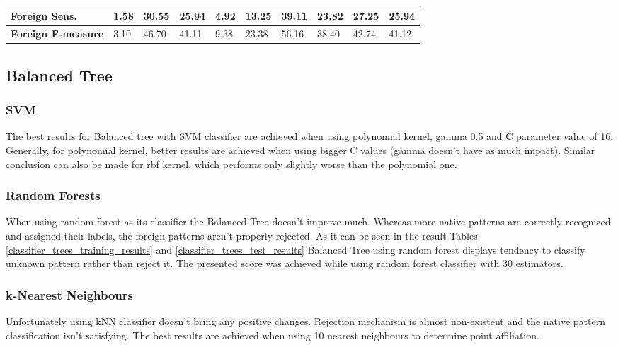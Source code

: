 \begin{table}[htp]
{\begin{tabular}{l|l|l|l|l|l|l|l|l|l|}
			\multicolumn{1}{|l|}{\textbf{Foreign Sens.}}       & 1.58          & 30.55         & 25.94       & 4.92          & 13.25         & 39.11       & 23.82          & 27.25         & 25.94        \\ \hline
			\multicolumn{1}{|l|}{\textbf{Foreign F-measure}}         & 3.10          & 46.70         & 41.11       & 9.38          & 23.38         & 56.16       & 38.40          & 42.74         & 41.12        \\ \hline
		\end{tabular}
	}
\end{table}

\subsection{Balanced Tree}

\subsubsection{SVM}

The best results for Balanced tree with SVM classifier are achieved when using polynomial kernel, gamma 0.5 and C parameter value of 16. Generally, for polynomial kernel, better results are achieved when using bigger C values (gamma doesn't have as much impact). Similar conclusion can also be made for rbf kernel, which performs only slightly worse than the polynomial one.

\subsubsection{Random Forests}

When using random forest as its classifier the Balanced Tree doesn't improve much. Whereas more native patterns are correctly recognized and assigned their labels, the foreign patterns aren't properly rejected. As it can be seen in the result Tables \ref{classifier_trees_training_results} and \ref{classifier_trees_test_results} Balanced Tree using random forest displays tendency to classify unknown pattern rather than reject it. The presented score was achieved while using random forest classifier with 30 estimators.

\subsubsection{k-Nearest Neighbours}

Unfortunately using kNN classifier doesn't bring any positive changes. Rejection mechanism is almost non-existent and the native pattern classification isn't satisfying. The best results are achieved when using 10 nearest neighbours to determine point affiliation.

